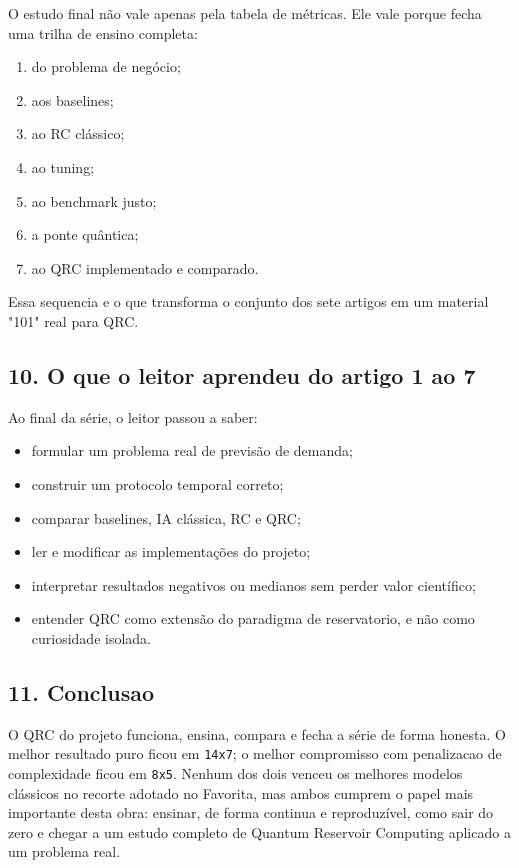 \documentclass[12pt]{article}
\providecommand{\tightlist}{%
          \setlength{\itemsep}{0pt}\setlength{\parskip}{0pt}}
\begin{document}
O estudo final não vale apenas pela tabela de métricas. Ele vale porque fecha uma trilha de ensino completa:

\begin{enumerate}
\def\labelenumi{\arabic{enumi}.}
\tightlist
\item
  do problema de negócio;
\item
  aos baselines;
\item
  ao RC clássico;
\item
  ao tuning;
\item
  ao benchmark justo;
\item
  a ponte quântica;
\item
  ao QRC implementado e comparado.
\end{enumerate}

Essa sequencia e o que transforma o conjunto dos sete artigos em um material "101" real para QRC.

\subsection{10. O que o leitor aprendeu do artigo 1 ao 7}\label{10-o-que-o-leitor-aprendeu-do-artigo-1-ao-7}

Ao final da série, o leitor passou a saber:

\begin{itemize}
\tightlist
\item
  formular um problema real de previsão de demanda;
\item
  construir um protocolo temporal correto;
\item
  comparar baselines, IA clássica, RC e QRC;
\item
  ler e modificar as implementações do projeto;
\item
  interpretar resultados negativos ou medianos sem perder valor científico;
\item
  entender QRC como extensão do paradigma de reservatorio, e não como curiosidade isolada.
\end{itemize}

\subsection{11. Conclusao}\label{11-conclusao}

O QRC do projeto funciona, ensina, compara e fecha a série de forma honesta. O melhor resultado puro ficou em \texttt{14x7}; o melhor compromisso com penalizacao de complexidade ficou em \texttt{8x5}. Nenhum dos dois venceu os melhores modelos clássicos no recorte adotado no Favorita, mas ambos cumprem o papel mais importante desta obra: ensinar, de forma continua e reproduzível, como sair do zero e chegar a um estudo completo de Quantum Reservoir Computing aplicado a um problema real.
\end{document}
